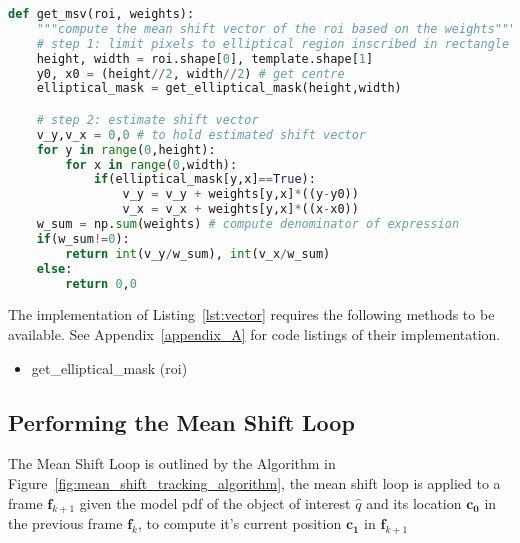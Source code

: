 \begin{lstlisting}[language=Python, caption={Computing Mean Shift Vector}, captionpos=b, label={lst:msv}]
def get_msv(roi, weights):
    """compute the mean shift vector of the roi based on the weights"""
    # step 1: limit pixels to elliptical region inscribed in rectangle
    height, width = roi.shape[0], template.shape[1]
    y0, x0 = (height//2, width//2) # get centre 
    elliptical_mask = get_elliptical_mask(height,width)

    # step 2: estimate shift vector
    v_y,v_x = 0,0 # to hold estimated shift vector
    for y in range(0,height):
        for x in range(0,width): 
            if(elliptical_mask[y,x]==True):
                v_y = v_y + weights[y,x]*((y-y0)) 
                v_x = v_x + weights[y,x]*((x-x0))
    w_sum = np.sum(weights) # compute denominator of expression
    if(w_sum!=0):
        return int(v_y/w_sum), int(v_x/w_sum)
    else:
        return 0,0
\end{lstlisting}

The implementation of Listing~\ref{lst:vector} requires the following methods to
be available. See Appendix~\ref{appendix_A} for code listings of their implementation. 
\begin{itemize}
    \item get\_elliptical\_mask (roi)
\end{itemize}

\subsection{Performing the Mean Shift Loop}
The Mean Shift Loop is outlined by the Algorithm in
Figure~\ref{fig:mean_shift_tracking_algorithm}, the mean shift loop is
applied to a frame $\mathbf{f}_{k+1}$ given the model pdf of the object of
interest $\hat{q}$ and its location $\mathbf{c_0}$ in the previous frame
$\mathbf{f}_{k}$, to compute it's current position $\mathbf{c_1}$ in
$\mathbf{f}_{k+1}$

